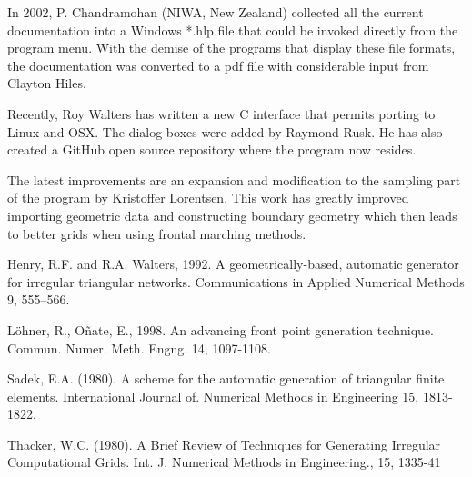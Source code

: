 \documentclass{article}
\begin{document}
In 2002, P. Chandramohan (NIWA, New Zealand) collected all the current documentation into a Windows *.hlp
file that could be invoked directly from the program menu. With the demise of the programs that display these
file formats, the documentation was converted to a pdf file with considerable input from Clayton Hiles.

Recently, Roy Walters has written a new C interface that permits porting to Linux and OSX. The dialog boxes 
were added by Raymond Rusk. He has also created a GitHub open source repository where the program now resides.

The latest improvements are an expansion and modification to the sampling part of the program by 
Kristoffer Lorentsen. This work has greatly improved importing geometric data and constructing boundary
geometry which then leads to better grids when using frontal marching methods.


\newpage
%
%

\begin{thebibliography}{99}


Henry, R.F. and R.A. Walters, 1992. 
A geometrically-based, automatic generator for irregular triangular networks. 
Communications in Applied Numerical Methods 9, 555--566.

L\"{o}hner, R., O\~{n}ate, E., 1998.
An advancing front point generation technique.
Commun. Numer. Meth. Engng. 14, 1097-1108.

Sadek, E.A. (1980). 
A scheme for the automatic generation of triangular finite elements.
International Journal of. Numerical Methods in Engineering 15, 1813-1822.

Thacker, W.C. (1980).
A Brief Review of Techniques for Generating Irregular Computational Grids.
Int. J. Numerical Methods in Engineering., 15, 1335-41

\end{thebibliography}
\end{document}
